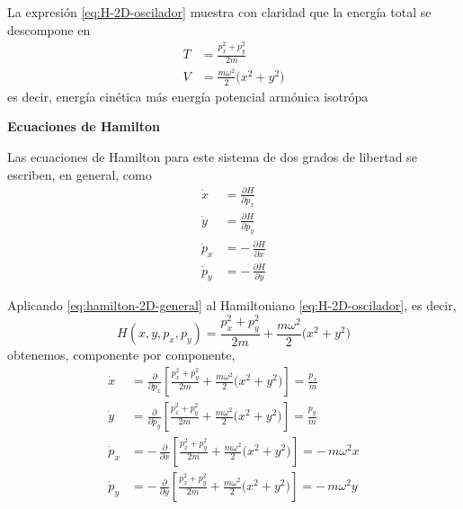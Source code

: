 \documentclass{article}
\begin{document}
La expresión \eqref{eq:H-2D-oscilador} muestra con claridad que la energía
total se descompone en
\begin{equation}
\begin{split}
T &= \frac{p_{x}^{2}+p_{y}^{2}}{2m} \\[4pt]
V &= \frac{m\omega^{2}}{2}\bigl(x^{2}+y^{2}\bigr)
\end{split}
\label{eq:T-V-2D}
\end{equation}
es decir, energía cinética más energía potencial armónica isotrópa

\textcolor{trueblue}{\textbf{Ecuaciones de Hamilton}}

Las ecuaciones de Hamilton para este sistema de dos grados de libertad se
escriben, en general, como
\begin{equation}
\begin{split}
\dot{x} &= \frac{\partial H}{\partial p_{x}} \\[4pt]
\dot{y} &= \frac{\partial H}{\partial p_{y}} \\[4pt]
\dot{p}_{x} &= -\,\frac{\partial H}{\partial x} \\[4pt]
\dot{p}_{y} &= -\,\frac{\partial H}{\partial y}
\end{split}
\label{eq:hamilton-2D-general}
\end{equation}

Aplicando \eqref{eq:hamilton-2D-general} al Hamiltoniano
\eqref{eq:H-2D-oscilador}, es decir,
\[
H(x,y,p_{x},p_{y})
= \frac{p_{x}^{2}+p_{y}^{2}}{2m}
  + \frac{m\omega^{2}}{2}\bigl(x^{2}+y^{2}\bigr)
\]
obtenemos, componente por componente,
\begin{equation}
\begin{split}
\dot{x} &=
\frac{\partial}{\partial p_{x}}
\left[
  \frac{p_{x}^{2}+p_{y}^{2}}{2m}
  + \frac{m\omega^{2}}{2}\bigl(x^{2}+y^{2}\bigr)
\right]
= \frac{p_{x}}{m} \\[6pt]
\dot{y} &=
\frac{\partial}{\partial p_{y}}
\left[
  \frac{p_{x}^{2}+p_{y}^{2}}{2m}
  + \frac{m\omega^{2}}{2}\bigl(x^{2}+y^{2}\bigr)
\right]
= \frac{p_{y}}{m} \\[6pt]
\dot{p}_{x} &=
-\,\frac{\partial}{\partial x}
\left[
  \frac{p_{x}^{2}+p_{y}^{2}}{2m}
  + \frac{m\omega^{2}}{2}\bigl(x^{2}+y^{2}\bigr)
\right]
= -\,m\omega^{2}x \\[6pt]
\dot{p}_{y} &=
-\,\frac{\partial}{\partial y}
\left[
  \frac{p_{x}^{2}+p_{y}^{2}}{2m}
  + \frac{m\omega^{2}}{2}\bigl(x^{2}+y^{2}\bigr)
\right]
= -\,m\omega^{2}y
\end{split}
\label{eq:hamilton-2D-oscilador}
\end{equation}
\end{document}
